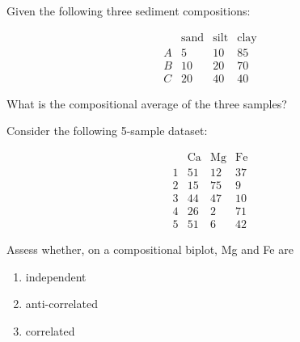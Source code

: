 \documentclass{article}
\begin{document}
\vspace{1cm}

\begin{minipage}{10cm}

Given the following three sediment compositions:

\[
\begin{array}{c|ccc}
  & \mbox{sand} & \mbox{silt} & \mbox{clay} \\ \hline
  A & 5 & 10 & 85 \\
  B & 10 & 20 & 70 \\
  C & 20 & 40 & 40
\end{array}
\]

What is the compositional average of the three samples?

\end{minipage}

\vspace{1cm}

\begin{minipage}{10cm}

Consider the following 5-sample dataset:

\[ \begin{array}{c|cccc}
  & \mbox{Ca} & \mbox{Mg} & \mbox{Fe} \\ \hline
  1 & 51 & 12 & 37 \\
  2 & 15 & 75 & 9 \\
  3 & 44 & 47 & 10 \\
  4 & 26 & 2 & 71 \\
  5 & 51 & 6 & 42
\end{array}
\]

Assess whether, on a compositional biplot, Mg and Fe are

\begin{enumerate}
\item independent
\item anti-correlated
\item correlated
\end{enumerate}

\end{minipage}
\end{document}
